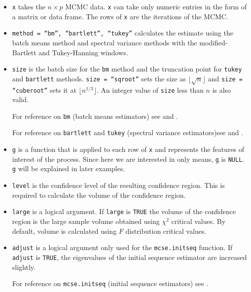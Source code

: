 \documentclass[11pt]{article}\usepackage[]{graphicx}\usepackage[]{color}
\begin{document}
\begin{itemize}
	\item \texttt{x} takes the $n \times p$ MCMC data. \texttt{x} can take only numeric entries in the form of a matrix or data frame. The rows of \texttt{x} are the iterations of the MCMC.

	\item \texttt{method = ``bm'', ``bartlett'', ``tukey''} calculates the estimate using the batch means method and spectral variance methods with the modified-Bartlett and Tukey-Hanning windows.

	\item \texttt{size} is the batch size for the \texttt{bm} method and the truncation point for \texttt{tukey} and \texttt{bartlett} methods.  \texttt{size = ``sqroot''} sets the size as $\lfloor \sqrt{n} \rfloor$ and \texttt{size = ``cuberoot''} sets it at $\lfloor n^{1/3} \rfloor$. An integer value of \texttt{size} less than $n$ is also valid.
	
For reference on \texttt{bm} (batch means estimators) see \cite{jones2006fixed} and \cite{vats:fleg:jones:2017b}.

For reference on \texttt{bartlett} and \texttt{tukey} (spectral variance estimators)see \cite{flegal2010batch} and \cite{vats2015strong}.

	\item \texttt{g} is a function that is applied to each row of \texttt{x} and represents the features of interest of the process. Since here we are interested in only means, \texttt{g} is \texttt{NULL}. \texttt{g} will be explained in later examples.

	\item \texttt{level} is the confidence level of the resulting confidence region. This is required to calculate the volume of the confidence region.

	\item \texttt{large} is a logical argument. If \texttt{large} is \texttt{TRUE} the volume of the confidence region is the large sample volume obtained using $\chi^2$ critical values. By default, volume is calculated using $F$ distribution critical values.
	
	\item \texttt{adjust} is a logical argument only used for the \texttt{mcse.initseq} function. If \texttt{adjust} is \texttt{TRUE}, the eigenvalues of the initial sequence estimator are increased slightly.
	
For reference on \texttt{mcse.initseq} (initial sequence estimators) see \cite{dai2017multivariate}.
\end{itemize}
\end{document}
